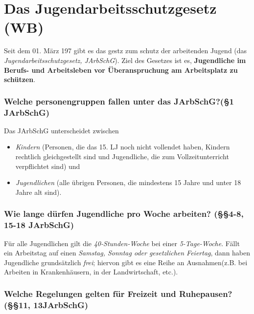 \documentclass[a4paper, 12pt]{report}
\begin{document}
\section{Das Jugendarbeitsschutzgesetz (WB)}

Seit dem 01. März 197 gibt es das gestz zum schutz der arbeitenden Jugend (das
\emph{Jugendarbeitsschutzgesetz, JArbSchG}). Ziel des Gesetzes ist es,
\textbf{Jugendliche im Berufs- und Arbeitsleben vor Überanspruchung am
Arbeitsplatz zu schützen}. \\

\subsubsection{Welche personengruppen fallen unter das JArbSchG?(\S 1 JArbSchG)}
Das JArbSchG unterscheidet zwischen
\begin{itemize}
    \item \emph{Kindern} (Personen, die das 15. LJ noch nicht vollendet haben,
	Kindern rechtlich gleichgestellt sind und Jugendliche, die zum
	Vollzeitunterricht verpflichtet sind) und
    \item \emph{Jugendlichen} (alle übrigen Personen, die mindestens 15 Jahre
	und unter 18 Jahre alt sind).
\end{itemize}

\subsubsection{Wie lange dürfen Jugendliche pro Woche arbeiten?
(\S\S 4-8, 15-18 JArbSchG)}

Für alle Jugendlichen gilt die \emph{40-Stunden-Woche} bei einer
\emph{5-Tage-Woche}. Fällt ein Arbeitstag auf einen \emph{Samstag, Sonntag oder
gesetzlichen Feiertag}, dann haben Jugendliche grundsätzlich \emph{frei};
hiervon gibt es eine Reihe an Ausnahmen(z.B. bei Arbeiten in Krankenhäusern, in
der Landwirtschaft, etc.).

\newpage
\subsubsection{Welche Regelungen gelten für Freizeit und Ruhepausen?
(\S\S 11, 13JArbSchG)}
\end{document}
